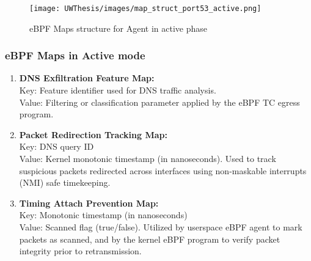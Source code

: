\documentclass [11pt, proquest] {uwthesis}[2020/02/24]
\begin{document}
\begin{figure}[htbp]
\centering
\texttt{[image: UWThesis/images/map\_struct\_port53\_active.png]}
\caption{eBPF Maps structure for Agent in active phase}
\label{sec:dp_eBPF_LRU_Maps_active}
\end{figure}

\subsubsection{\textbf{eBPF Maps in Active mode}}
\begin{enumerate}[itemsep=1pt,parsep=0pt]
\label{sec:active-maps}
\item \textbf{DNS Exfiltration Feature Map:} \\
Key: Feature identifier used for DNS traffic analysis. \\
Value: Filtering or classification parameter applied by the eBPF TC egress program.

\item \textbf{Packet Redirection Tracking Map:} \\
Key: DNS query ID \\
Value: Kernel monotonic timestamp (in nanoseconds). Used to track suspicious packets redirected across interfaces using non-maskable interrupts (NMI) safe timekeeping.

\item \textbf{Timing Attach Prevention Map:} \\
Key: Monotonic timestamp (in nanoseconds) \\
Value: Scanned flag (true/false). Utilized by userspace eBPF agent to mark packets as scanned, and by the kernel eBPF program to verify packet integrity prior to retransmission.
\end{enumerate}
\end{document}
